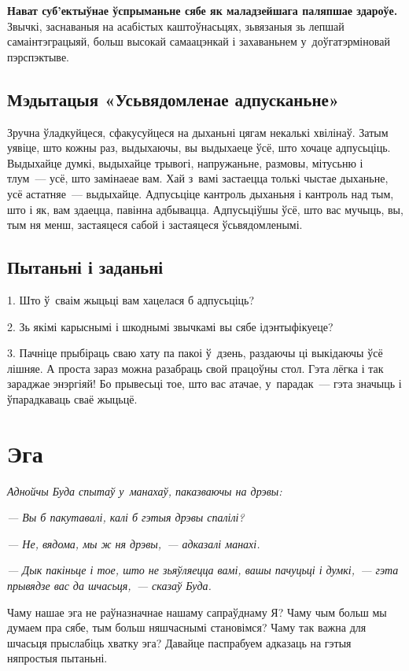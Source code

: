 \textbf{Нават суб'ектыўнае ўспрыманьне сябе як маладзейшага паляпшае здароўе.} Звычкі, заснаваныя на асабістых каштоўнасьцях, зьвязаныя зь лепшай самаінтэграцыяй, больш высокай самаацэнкай і захаваньнем у~доўгатэрміновай пэрспэктыве.

\subsection*{Мэдытацыя «Усьвядомленае адпусканьне»}

Зручна ўладкуйцеся, сфакусуйцеся на дыханьні цягам некалькі хвілінаў. Затым уявіце, што кожны раз, выдыхаючы, вы выдыхаеце ўсё, што хочаце адпусьціць. Выдыхайце думкі, выдыхайце трывогі, напружаньне, размовы, мітусьню і тлум~--- усё, што замінаеае вам. Хай з~вамі застаецца толькі чыстае дыханьне, усё астатняе~--- выдыхайце. Адпусьціце кантроль дыханьня і кантроль над тым, што і як, вам здаецца, павінна адбывацца. Адпусьціўшы ўсё, што вас мучыць, вы, тым ня менш, застаяцеся сабой і застаяцеся ўсьвядомленымі.

\subsection*{Пытаньні і заданьні}

1. Што ў~сваім жыцьці вам хацелася б адпусьціць?

2. Зь якімі карыснымі і шкоднымі звычкамі вы сябе ідэнтыфікуеце?

3. Пачніце прыбіраць сваю хату па пакоі ў~дзень, раздаючы ці выкідаючы ўсё лішняе. А проста зараз можна разабраць свой працоўны стол. Гэта лёгка і так зараджае энэргіяй! Бо прывесьці тое, што вас атачае, у~парадак~--- гэта значыць і ўпарадкаваць сваё жыцьцё.


\section{Эга}

\emph{Аднойчы Буда спытаў у~манахаў, паказваючы на дрэвы:} 

\emph{--- Вы б пакутавалі, калі б гэтыя дрэвы спалілі?}

\emph{--- Не, вядома, мы ж ня дрэвы,~--- адказалі манахі.}

\emph{--- Дык пакіньце і тое, што не зьяўляецца вамі, вашы пачуцьці і думкі,~--- гэта прывядзе вас да шчасьця,~--- сказаў Буда.}

Чаму нашае эга не раўназначнае нашаму сапраўднаму Я? Чаму чым больш мы думаем пра сябе, тым больш няшчаснымі становімся? Чаму так важна для шчасьця прыслабіць хватку эга? Давайце паспрабуем адказаць на гэтыя няпростыя пытаньні.

